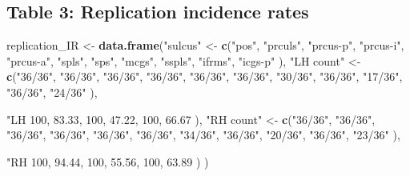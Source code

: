 \documentclass[
]{article}
\newenvironment{Shaded}{\begin{snugshade}}{\end{snugshade}}
\newcommand{\DecValTok}[1]{\textcolor[rgb]{0.00,0.00,0.81}{#1}}
\newcommand{\FloatTok}[1]{\textcolor[rgb]{0.00,0.00,0.81}{#1}}
\newcommand{\KeywordTok}[1]{\textcolor[rgb]{0.13,0.29,0.53}{\textbf{#1}}}
\newcommand{\NormalTok}[1]{#1}
\newcommand{\StringTok}[1]{\textcolor[rgb]{0.31,0.60,0.02}{#1}}
\begin{document}
\hypertarget{table-3-replication-incidence-rates}{%
\subsection{Table 3: Replication incidence
rates}\label{table-3-replication-incidence-rates}}

\begin{Shaded}
\begin{Highlighting}[]
\NormalTok{replication_IR <-}\StringTok{ }\KeywordTok{data.frame}\NormalTok{(}\StringTok{"sulcus"}\NormalTok{ <-}\StringTok{ }\KeywordTok{c}\NormalTok{(}\StringTok{"pos"}\NormalTok{, }\StringTok{"prculs"}\NormalTok{, }\StringTok{"prcus-p"}\NormalTok{, }\StringTok{"prcus-i"}\NormalTok{, }\StringTok{"prcus-a"}\NormalTok{, }
                                         \StringTok{"spls"}\NormalTok{, }\StringTok{"sps"}\NormalTok{, }\StringTok{"mcgs"}\NormalTok{, }\StringTok{"sspls"}\NormalTok{, }\StringTok{"ifrms"}\NormalTok{, }\StringTok{"icgs-p"} 
\NormalTok{                                       ),}
                      \StringTok{"LH count"}\NormalTok{ <-}\StringTok{ }\KeywordTok{c}\NormalTok{(}\StringTok{"36/36"}\NormalTok{, }\StringTok{"36/36"}\NormalTok{, }\StringTok{"36/36"}\NormalTok{, }\StringTok{"36/36"}\NormalTok{, }\StringTok{"36/36"}\NormalTok{,}
                                      \StringTok{"36/36"}\NormalTok{, }\StringTok{"30/36"}\NormalTok{, }\StringTok{"36/36"}\NormalTok{, }\StringTok{"17/36"}\NormalTok{, }\StringTok{"36/36"}\NormalTok{, }\StringTok{"24/36"}
\NormalTok{                           ),}
                           \StringTok{"LH %"}\NormalTok{ <-}\StringTok{ }\KeywordTok{c}\NormalTok{(}\DecValTok{100}\NormalTok{, }\DecValTok{100}\NormalTok{, }\DecValTok{100}\NormalTok{, }\DecValTok{100}\NormalTok{, }\DecValTok{100}\NormalTok{,}
                                       \DecValTok{100}\NormalTok{, }\FloatTok{83.33}\NormalTok{, }\DecValTok{100}\NormalTok{, }\FloatTok{47.22}\NormalTok{, }\DecValTok{100}\NormalTok{, }\FloatTok{66.67}
\NormalTok{                           ),}
                           \StringTok{"RH count"}\NormalTok{ <-}\StringTok{ }\KeywordTok{c}\NormalTok{(}\StringTok{"36/36"}\NormalTok{, }\StringTok{"36/36"}\NormalTok{, }\StringTok{"36/36"}\NormalTok{, }\StringTok{"36/36"}\NormalTok{, }\StringTok{"36/36"}\NormalTok{,}
                                      \StringTok{"36/36"}\NormalTok{, }\StringTok{"34/36"}\NormalTok{, }\StringTok{"36/36"}\NormalTok{, }\StringTok{"20/36"}\NormalTok{, }\StringTok{"36/36"}\NormalTok{, }\StringTok{"23/36"}
\NormalTok{                      ),}
                           \StringTok{"RH %"}\NormalTok{ <-}\StringTok{ }\KeywordTok{c}\NormalTok{(}\DecValTok{100}\NormalTok{, }\DecValTok{100}\NormalTok{, }\DecValTok{100}\NormalTok{, }\DecValTok{100}\NormalTok{, }\DecValTok{100}\NormalTok{,}
                                       \DecValTok{100}\NormalTok{, }\FloatTok{94.44}\NormalTok{, }\DecValTok{100}\NormalTok{, }\FloatTok{55.56}\NormalTok{, }\DecValTok{100}\NormalTok{, }\FloatTok{63.89}
\NormalTok{                      )}
\NormalTok{                           )}

}}
\end{Highlighting}
\end{Shaded}
\end{document}
